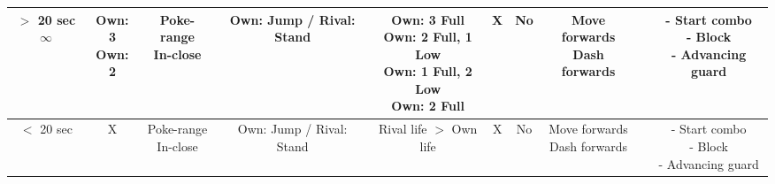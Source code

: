 \documentclass{article}
\begin{document}
\begin{landscape}
\begin{table}[h!]
\begin{center}
\begin{tabular*}{27cm}{c|c|c|c|c|c|c|c|c|c}
      \hline
      \makecell{$>$ 20 sec \\ $\infty$} & \makecell {Own: 3 \\ Own: 2} & \makecell{Poke-range \\ In-close} & Own: Jump / Rival: Stand & \makecell {Own: 3 Full \\ Own: 2 Full, 1 Low \\ Own: 1 Full, 2 Low \\ Own: 2 Full} & X & No & \makecell{Move forwards \\ Dash forwards} & & \makecell{- Start combo \\ - Block \\ - Advancing guard}\\
      \hline
      $<$ 20 sec & X & \makecell{Poke-range \\ In-close} & Own: Jump / Rival: Stand & Rival life $>$ Own life & X & No & \makecell{Move forwards \\ Dash forwards} & & \makecell{- Start combo \\ - Block \\ - Advancing guard}\\
      \hline
     \end{tabular*}
  \end{center}
\end{table}

\end{landscape}

\newpage
\end{document}
